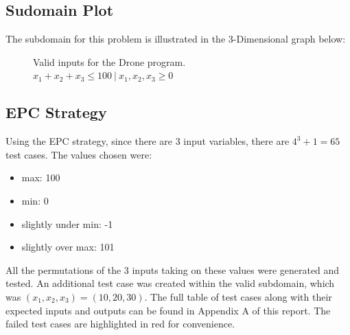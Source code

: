 \documentclass[letterpaper]{article}
\begin{document}
\subsection{Sudomain Plot}
The subdomain for this problem is illustrated in the 3-Dimensional graph below:
\begin{figure}[H]
	\centering
{}
\caption{Valid inputs for the Drone program. $x_1 + x_2 + x_3 \leq 100\ |\ x_1, x_2, x_3 \geq 0$}
\end{figure}

\subsection{EPC Strategy}
Using the EPC strategy, since there are 3 input variables, there are
$4^3 + 1 = 65$ test cases. The values chosen were:
\begin{itemize}
	\item max: 100
	\item min: 0
	\item slightly under min: -1
	\item slightly over max: 101
\end{itemize}
All the permutations of the 3 inputs taking on these values were generated
and tested. An additional test case was created within the valid subdomain,
which was $(x_1, x_2, x_3) = (10, 20, 30)$. The full table of test cases
along with their expected inputs and outputs can be found in Appendix A of this
report. The failed test cases are highlighted in red for convenience.
\end{document}
